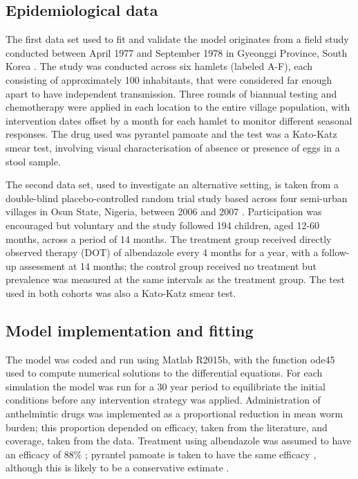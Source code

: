 \subsection{Epidemiological data}

The first data set used to fit and validate the model originates from a field study conducted between April 1977 and September 1978 in Gyeonggi Province, South Korea \cite{Seo}. The study was conducted across six hamlets (labeled A-F), each consisting of approximately 100 inhabitants, that were considered far enough apart to have independent transmission. Three rounds of biannual testing and chemotherapy were applied in each location to the entire village population, with intervention dates offset by a month for each hamlet to monitor different seasonal responses. The drug used was pyrantel pamoate and the test was a Kato-Katz smear test, involving visual characterisation of absence or presence of eggs in a stool sample.

The second data set, used to investigate an alternative setting, is taken from a double-blind placebo-controlled random trial study based across four semi-urban villages in Osun State, Nigeria, between 2006 and 2007 \cite{Kirwan}. Participation was encouraged but voluntary and the study followed 194 children, aged 12-60 months, across a period of 14 months. The treatment group received directly observed therapy (DOT) of albendazole every 4 months for a year, with a follow-up assessment at 14 months; the control group received no treatment but prevalence was measured at the same intervals as the treatment group. The test used in both cohorts was also a Kato-Katz smear test.

\subsection{Model implementation and fitting}

The model was coded and run using Matlab R2015b, with the function ode45 used to compute numerical solutions to the differential equations. For each simulation the model was run for a 30 year period to equilibriate the initial conditions before any intervention strategy was applied. Administration of anthelmintic drugs was implemented as a proportional reduction in mean worm burden; this proportion depended on efficacy, taken from the literature, and coverage, taken from the data. Treatment using albendazole was assumed to have an efficacy of $88$\% \cite{Keiser}; pyrantel pamoate is taken to have the same efficacy \cite{Keiser}, although this is likely to be a conservative estimate \cite{Albonico}.

